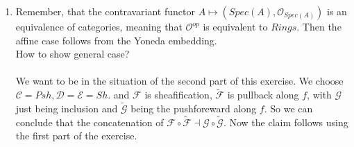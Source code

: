 \begin{exercise}{3}
    \begin{enumerate}
        \item Remember, that the 
        contravariant functor
         $A\mapsto (Spec(A),\mathcal{O}_{Spec(A)})$
         is an equivalence of categories, meaning that 
         $\mathcal{O}^{op}$ is equivalent to $Rings$. Then
         the affine case follows from the Yoneda embedding.\\
         How to show general case?
         \\
         \\
         We want to be in the situation of the second part of
         this exercise. We choose $\mathcal{C}=Psh, \mathcal{D}=\mathcal{E}=Sh$.
         and $\mathcal{F}$ is sheafification, $\mathcal{\tilde{F}}$ is pullback
         along $f$, with $\mathcal{G}$ just being inclusion and $\tilde{\mathcal{G}}$
         being the pushforeward
         along $f$. So we can conclude that the concatenation of 
         $\mathcal{F}\circ \mathcal{\tilde{F}}\dashv \mathcal{G}\circ
            \mathcal{\tilde{G}}$.
         Now the claim follows using the first part of the exercise.

    \end{enumerate}
\end{exercise}

